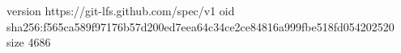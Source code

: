 version https://git-lfs.github.com/spec/v1
oid sha256:f565ca589f97176b57d200ed7eea64c34ce2ce84816a999fbe518fd054202520
size 4686
